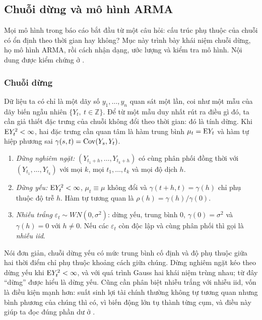 \subsection{Chuỗi dừng và mô hình ARMA}

Mọi mô hình trong báo cáo bắt đầu từ một câu hỏi: cấu trúc phụ thuộc của chuỗi có ổn định theo thời gian hay không? Mục này trình bày khái niệm chuỗi dừng, họ mô hình ARMA, rồi cách nhận dạng, ước lượng và kiểm tra mô hình. Nội dung được kiểm chứng ở .

\subsubsection{Chuỗi dừng}

Dữ liệu ta có chỉ là một dãy số $y_1,\dots,y_n$ quan sát một lần, coi như một mẫu của dãy biến ngẫu nhiên $\{Y_t,\ t\in\mathbb Z\}$. Để từ một mẫu duy nhất rút ra điều gì đó, ta cần giả thiết đặc trưng của chuỗi không đổi theo thời gian: đó là tính dừng. Khi $\mathrm{E} Y_t^2<\infty$, hai đặc trưng cần quan tâm là hàm trung bình $\mu_t=\mathrm{E} Y_t$ và hàm tự hiệp phương sai $\gamma(s,t)=\operatorname{Cov}(Y_s,Y_t)$.
\begin{kq}
\begin{enumerate}[label=(\roman*),leftmargin=*,itemsep=1pt]
\item \emph{Dừng nghiêm ngặt:} $(Y_{t_1+h},\dots,Y_{t_k+h})$ có cùng phân phối đồng thời với $(Y_{t_1},\dots,Y_{t_k})$ với mọi $k$, mọi $t_1,\dots,t_k$ và mọi độ dịch $h$.
\item \emph{Dừng yếu:} $\mathrm{E} Y_t^2<\infty$, $\mu_t\equiv\mu$ không đổi và $\gamma(t+h,t)=\gamma(h)$ chỉ phụ thuộc độ trễ $h$. Hàm tự tương quan là $\rho(h)=\gamma(h)/\gamma(0)$.
\item \emph{Nhiễu trắng} $\varepsilon_t\sim WN(0,\sigma^2)$: dừng yếu, trung bình $0$, $\gamma(0)=\sigma^2$ và $\gamma(h)=0$ với $h\neq0$. Nếu các $\varepsilon_t$ còn độc lập và cùng phân phối thì gọi là \emph{nhiễu iid}.
\end{enumerate}
\end{kq}
Nói đơn giản, chuỗi dừng yếu có mức trung bình cố định và độ phụ thuộc giữa hai thời điểm chỉ phụ thuộc khoảng cách giữa chúng. Dừng nghiêm ngặt kéo theo dừng yếu khi $\mathrm{E} Y_t^2<\infty$, và với quá trình Gauss hai khái niệm trùng nhau; từ đây ``dừng'' được hiểu là dừng yếu. Cũng cần phân biệt nhiễu trắng với nhiễu iid, vốn là điều kiện mạnh hơn: suất sinh lợi tài chính thường không tự tương quan nhưng bình phương của chúng thì có, vì biến động lớn tụ thành từng cụm, và điều này giúp ta đọc đúng phần dư ở .

